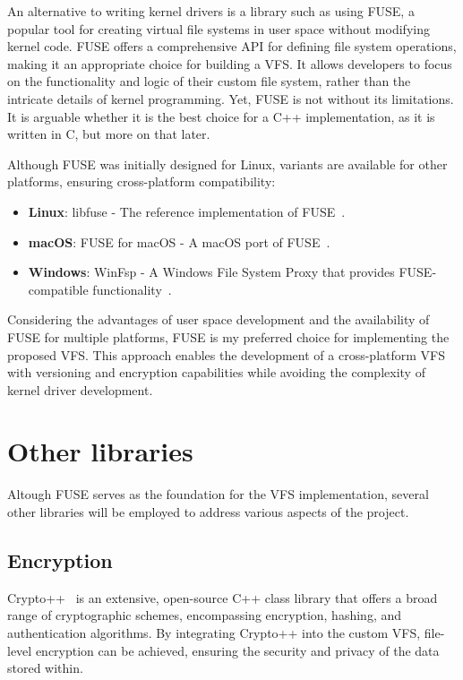 An alternative to writing kernel drivers is a library such as using FUSE, a popular tool for creating virtual file systems in user space without modifying kernel code.
FUSE offers a comprehensive API for defining file system operations, making it an appropriate choice for building a VFS.
It allows developers to focus on the functionality and logic of their custom file system, rather than the intricate details of kernel programming.
Yet, FUSE is not without its limitations.
It is arguable whether it is the best choice for a C++ implementation, as it is written in C, but more on that later.

Although FUSE was initially designed for Linux, variants are available for other platforms, ensuring cross-platform compatibility:

\begin{itemize}
    \item \textbf{Linux}: libfuse - The reference implementation of FUSE~\cite{libfuse}.
    \item \textbf{macOS}: FUSE for macOS - A macOS port of FUSE~\cite{osxfuse}.
    \item \textbf{Windows}: WinFsp - A Windows File System Proxy that provides FUSE-compatible functionality~\cite{winfsp}.
\end{itemize}

Considering the advantages of user space development and the availability of FUSE for multiple platforms, FUSE is my preferred choice for implementing the proposed VFS.
This approach enables the development of a cross-platform VFS with versioning and encryption capabilities while avoiding the complexity of kernel driver development.

\section{Other libraries}\label{sec:other-libraries-analysis}

Altough FUSE serves as the foundation for the VFS implementation, several other libraries will be employed to address various aspects of the project.

\subsection{Encryption}\label{subsec:encryption-analysis}

Crypto++~\cite{crypto_pp} is an extensive, open-source C++ class library that offers a broad range of cryptographic schemes, encompassing encryption, hashing, and authentication algorithms.
By integrating Crypto++ into the custom VFS, file-level encryption can be achieved, ensuring the security and privacy of the data stored within.


